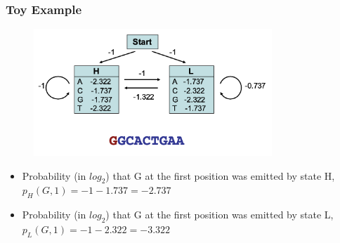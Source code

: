 \documentclass{beamer}
\begin{document}
\begin{frame}
    \frametitle{Toy Example}
    
    \begin{figure}[T]
        \includegraphics[width=0.8\textwidth]{img/10.png}
        \end{figure}
        \begin{itemize}
            \item         Probability (in $log_2$) that G at the first position was emitted by state H, $p_H(G,1) = -1 -1.737 = -2.737$
            \item         Probability (in $log_2$) that G at the first position was emitted by state L, $p_L(G,1) = -1 -2.322 = -3.322$
        \end{itemize}

    \end{frame}
\end{document}
